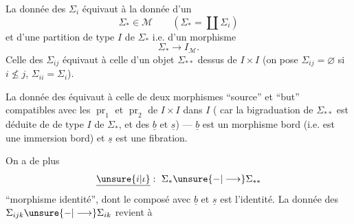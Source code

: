 
La donnée des \(\Sigma_i\) équivaut à la donnée d'un
\[
 \Sigma_*\in\mathcal M\qquad
 \left(\Sigma_*=\coprod\Sigma_i\right)
\]
et d'une partition de type \(I\) de \(\Sigma_*\) i.e. d'un morphisme
\[
 \Sigma_*\longrightarrow I_{\mathcal M}.
\]
Celle des \(\Sigma_{ij}\) équivaut à celle
d'un objet \(\Sigma_{**}\)   dessus de \(I\times I\)
(on pose \(\Sigma_{ij}=\varnothing\) si \(i\not\le j\),
\(\Sigma_{ii}=\Sigma_i\)).

La donnée des
équivaut à celle de deux morphismes ``source'' et ``but''
\diagram{\begin{tikzcd}
 \Sigma_{**}\arrow[r,"\underline b"]\arrow[d,"\underline s"']&\Sigma_*\\
 \Sigma_*&
\end{tikzcd}}
compatibles avec les \(\operatorname{pr}_1\) et \(\operatorname{pr}_2\)
de \(I\times I\) dans \(I\)
(
car la bigraduation 
de \(\Sigma_{**}\) est déduite de 
 de type \(I\) de \(\Sigma_*\), et des
\(\underline b\) et \(\underline s\)) ---
 \(\underline b\) est 
un morphisme bord (i.e. est une
immersion bord) et \(\underline s\) est une fibration.

On a de plus 
\[
 \underline{\unsure{i|\iota}}:\ \Sigma_*\unsure{-|\longrightarrow}\Sigma_{**}
\]
``morphisme identité'', dont le composé avec \(\underline b\) et
\(\underline s\) est l'identité. La donnée des
\(\Sigma_{ijk}\unsure{-|\longrightarrow}\Sigma_{ik}\) revient à

